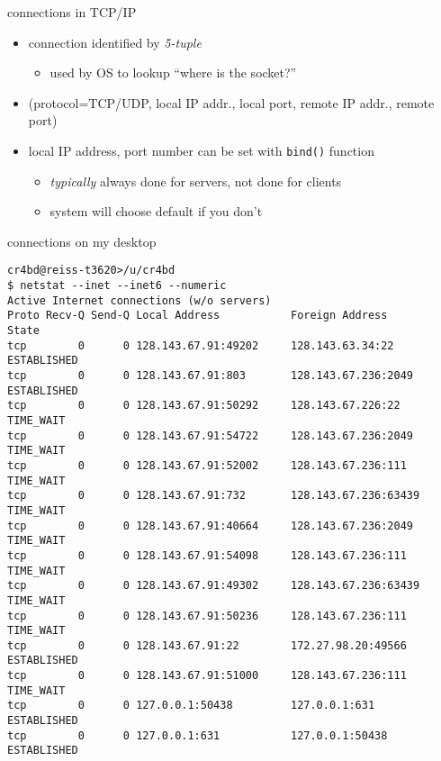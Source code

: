 \begin{frame}{connections in TCP/IP}
    \begin{itemize}
    \item connection identified by \textit{5-tuple}
        \begin{itemize}
        \item used by OS to lookup ``where is the socket?''
        \end{itemize}
    \item \small(protocol=TCP/UDP, local IP addr., local port, remote IP addr., remote port)
    \vspace{.5cm}
    \item local IP address, port number can be set with \texttt{bind()} function
        \begin{itemize}
        \item \textit{typically} always done for servers, not done for clients
        \item system will choose default if you don't
        \end{itemize}
    \end{itemize}
\end{frame}

\begin{frame}[fragile,label=laptopNetstatNormal]{connections on my desktop}
\begin{lstlisting}[language={},basicstyle=\fontsize{9.5}{10.5}\selectfont]
cr4bd@reiss-t3620>/u/cr4bd
$ netstat --inet --inet6 --numeric
Active Internet connections (w/o servers)
Proto Recv-Q Send-Q Local Address           Foreign Address         State      
tcp        0      0 128.143.67.91:49202     128.143.63.34:22        ESTABLISHED
tcp        0      0 128.143.67.91:803       128.143.67.236:2049     ESTABLISHED
tcp        0      0 128.143.67.91:50292     128.143.67.226:22       TIME_WAIT  
tcp        0      0 128.143.67.91:54722     128.143.67.236:2049     TIME_WAIT  
tcp        0      0 128.143.67.91:52002     128.143.67.236:111      TIME_WAIT  
tcp        0      0 128.143.67.91:732       128.143.67.236:63439    TIME_WAIT  
tcp        0      0 128.143.67.91:40664     128.143.67.236:2049     TIME_WAIT  
tcp        0      0 128.143.67.91:54098     128.143.67.236:111      TIME_WAIT  
tcp        0      0 128.143.67.91:49302     128.143.67.236:63439    TIME_WAIT  
tcp        0      0 128.143.67.91:50236     128.143.67.236:111      TIME_WAIT  
tcp        0      0 128.143.67.91:22        172.27.98.20:49566      ESTABLISHED
tcp        0      0 128.143.67.91:51000     128.143.67.236:111      TIME_WAIT  
tcp        0      0 127.0.0.1:50438         127.0.0.1:631           ESTABLISHED
tcp        0      0 127.0.0.1:631           127.0.0.1:50438         ESTABLISHED
\end{lstlisting}
\end{frame}

